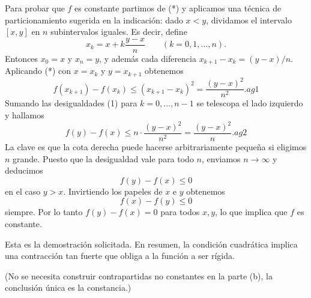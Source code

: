 Para probar que $f$ es constante partimos de (*) y aplicamos una técnica de
particionamiento sugerida en la indicación: dado $x<y$, dividamos el
intervalo $[x,y]$ en $n$ subintervalos iguales. Es decir, define
$$x_k = x + k\frac{y-x}{n}\qquad (k=0,1,\dots,n).$$
Entonces $x_0=x$ y $x_n=y$, y además cada diferencia $x_{k+1}-x_k=(y-x)/n$.
Aplicando (*) con $x=x_k$ y $y=x_{k+1}$ obtenemos
$$f(x_{k+1})-f(x_k) \le (x_{k+1}-x_k)^2 = \frac{(y-x)^2}{n^2}.	ag{1}$$
Sumando las desigualdades (1) para $k=0,\ldots,n-1$ se telescopa el lado
izquierdo y hallamos
$$f(y)-f(x) \le n\cdot\frac{(y-x)^2}{n^2} = \frac{(y-x)^2}{n}.	ag{2}$$
La clave es que la cota derecha puede hacerse arbitrariamente pequeña si
eligimos $n$ grande. Puesto que la desigualdad vale para todo $n$, enviamos
$n\to\infty$ y deducimos
$$f(y)-f(x) \le 0$$
en el caso $y>x$. Invirtiendo los papeles de $x$ e $y$ obtenemos
$$f(x)-f(y) \le 0$$
siempre. Por lo tanto $f(y)-f(x)=0$ para todos $x,y$, lo que implica que
$f$ es constante.

Esta es la demostración solicitada. En resumen, la condición cuadrática
implica una contracción tan fuerte que obliga a la función a ser rígida.

(No se necesita construir contrapartidas no constantes en la parte (b), la
conclusión única es la constancia.)